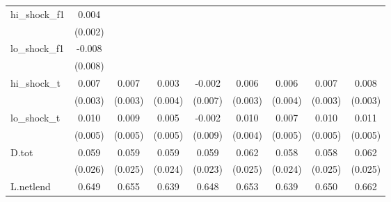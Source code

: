 {\begin{tabular}{l*{8}{c}}
\addlinespace
hi\_shock\_f1 &       0.004\sym{*}  &                     &                     &                     &                     &                     &                     &                     \\
            &     (0.002)         &                     &                     &                     &                     &                     &                     &                     \\
\addlinespace
lo\_shock\_f1 &      -0.008         &                     &                     &                     &                     &                     &                     &                     \\
            &     (0.008)         &                     &                     &                     &                     &                     &                     &                     \\
\addlinespace
hi\_shock\_t  &       0.007\sym{**} &       0.007\sym{**} &       0.003         &      -0.002         &       0.006\sym{**} &       0.006         &       0.007\sym{**} &       0.008\sym{**} \\
            &     (0.003)         &     (0.003)         &     (0.004)         &     (0.007)         &     (0.003)         &     (0.004)         &     (0.003)         &     (0.003)         \\
\addlinespace
lo\_shock\_t  &       0.010\sym{*}  &       0.009\sym{*}  &       0.005         &      -0.002         &       0.010\sym{**} &       0.007         &       0.010\sym{**} &       0.011\sym{**} \\
            &     (0.005)         &     (0.005)         &     (0.005)         &     (0.009)         &     (0.004)         &     (0.005)         &     (0.005)         &     (0.005)         \\
\addlinespace
D.tot       &       0.059\sym{**} &       0.059\sym{**} &       0.059\sym{**} &       0.059\sym{**} &       0.062\sym{**} &       0.058\sym{**} &       0.058\sym{**} &       0.062\sym{**} \\
            &     (0.026)         &     (0.025)         &     (0.024)         &     (0.023)         &     (0.025)         &     (0.024)         &     (0.025)         &     (0.025)         \\
\addlinespace
L.netlend   &       0.649\sym{***}&       0.655\sym{***}&       0.639\sym{***}&       0.648\sym{***}&       0.653\sym{***}&       0.639\sym{***}&       0.650\sym{***}&       0.662\sym{***}\\

\end{tabular}}
